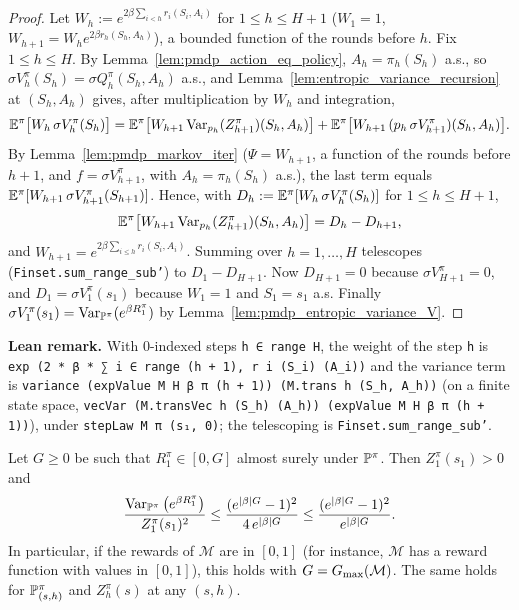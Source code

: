 \begin{proof}
\leanok
Let $W_h := e^{2\beta\sum_{i < h} r_i(S_i, A_i)}$ for $1 \le h \le H + 1$ ($W_1 = 1$,
$W_{h+1} = W_h e^{2\beta r_h(S_h, A_h)}$), a bounded function of the rounds before $h$. Fix
$1 \le h \le H$. By Lemma~\ref{lem:pmdp_action_eq_policy}, $A_h = \pi_h(S_h)$ a.s., so
$\sigma V^\pi_h(S_h) = \sigma Q^\pi_h(S_h, A_h)$ a.s., and Lemma~\ref{lem:entropic_variance_recursion}
at $(S_h, A_h)$ gives, after multiplication by $W_h$ and integration,
\[
  \mathbb{E}^\pi\big[W_h\,\sigma V^\pi_h(S_h)\big]
  = \mathbb{E}^\pi\big[W_{h+1}\operatorname{Var}_{p_h}(Z^\pi_{h+1})(S_h, A_h)\big]
  + \mathbb{E}^\pi\big[W_{h+1}\,(p_h\,\sigma V^\pi_{h+1})(S_h, A_h)\big] .
\]
By Lemma~\ref{lem:pmdp_markov_iter} ($\Psi = W_{h+1}$, a function of the rounds before $h + 1$,
and $f = \sigma V^\pi_{h+1}$, with $A_h = \pi_h(S_h)$ a.s.), the last term equals
$\mathbb{E}^\pi[W_{h+1}\,\sigma V^\pi_{h+1}(S_{h+1})]$. Hence, with $D_h := \mathbb{E}^\pi[W_h\,\sigma V^\pi_h(S_h)]$
for $1 \le h \le H + 1$,
\[
  \mathbb{E}^\pi\big[W_{h+1}\operatorname{Var}_{p_h}(Z^\pi_{h+1})(S_h, A_h)\big] = D_h - D_{h+1} ,
\]
and $W_{h+1} = e^{2\beta\sum_{i \le h} r_i(S_i,A_i)}$. Summing over $h = 1, \dots, H$ telescopes
(\texttt{Finset.sum\_range\_sub'}) to $D_1 - D_{H+1}$. Now $D_{H+1} = 0$ because
$\sigma V^\pi_{H+1} = 0$, and $D_1 = \sigma V^\pi_1(s_1)$ because $W_1 = 1$ and $S_1 = s_1$ a.s.
Finally $\sigma V^\pi_1(s_1) = \operatorname{Var}_{\mathbb{P}^\pi}(e^{\beta R^\pi_1})$ by
Lemma~\ref{lem:pmdp_entropic_variance_V}.
\end{proof}

\textbf{Lean remark.} With $0$-indexed steps \texttt{h ∈ range H}, the weight of the step
\texttt{h} is \texttt{exp (2 * β * ∑ i ∈ range (h + 1), r i (S\_i) (A\_i))} and the variance term is
\texttt{variance (expValue M H β π (h + 1)) (M.trans h (S\_h, A\_h))} (on a finite state space,
\texttt{vecVar (M.transVec h (S\_h) (A\_h)) (expValue M H β π (h + 1))}), under
\texttt{stepLaw M π (s₁, 0)}; the telescoping is \texttt{Finset.sum\_range\_sub'}.

\begin{lemma}\label{lem:variance_ratio_le}
\leanok
{}
Let $G \ge 0$ be such that $R^\pi_1 \in [0, G]$ almost surely under $\mathbb{P}^\pi$. Then
$Z^\pi_1(s_1) > 0$ and
\[
  \frac{\operatorname{Var}_{\mathbb{P}^\pi}\big(e^{\beta R^\pi_1}\big)}{Z^\pi_1(s_1)^2}
  \le \frac{(e^{\lvert \beta \rvert G} - 1)^2}{4\,e^{\lvert \beta \rvert G}}
  \le \frac{(e^{\lvert \beta \rvert G} - 1)^2}{e^{\lvert \beta \rvert G}} .
\]
In particular, if the rewards of $\mathcal M$ are in $[0, 1]$ (for instance, $\mathcal M$ has a
reward function with values in $[0, 1]$), this holds with $G = G_{\max}(\mathcal M)$. The same holds
for $\mathbb{P}^\pi_{(s,h)}$ and $Z^\pi_h(s)$ at any $(s, h)$.
\end{lemma}

